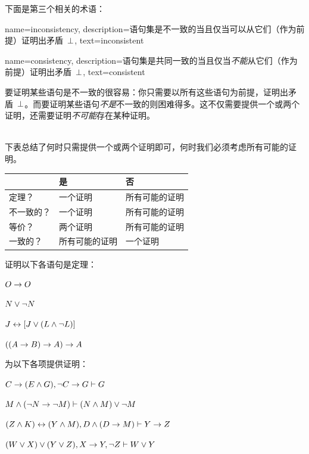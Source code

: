 下面是第三个相关的术语：

{    name={inconsistency},
  description={语句集是不一致的当且仅当可以从它们（作为前提）证明出矛盾~$\bot$},
    text={inconsistent}
}

{    name={consistency},
  description={语句集是共同一致的当且仅当\emph{不能}从它们（作为前提）证明出矛盾~$\bot$},
    text={consistent}
}

要证明某些语句是不一致的很容易：你只需要以所有这些语句为前提，证明出矛盾~$\bot$。而要证明某些语句\emph{不是}不一致的则困难得多。这不仅需要提供一个或两个证明，还需要证明\emph{不可能}存在某种证明。

\
\\
下表总结了何时只需提供一个或两个证明即可，何时我们必须考虑所有可能的证明。

\begin{center}
\begin{tabular}{l l l}
 & \textbf{是} & \textbf{否}\\
 \hline
定理？ & 一个证明 & 所有可能的证明\\
不一致的？ &  一个证明  & 所有可能的证明\\
等价？ & 两个证明 & 所有可能的证明\\
一致的？ & 所有可能的证明 & 一个证明\\
\end{tabular}
\end{center}

\practiceproblems
\problempart
证明以下各语句是定理：


\begin{compactlist}
\item $O \rightarrow O$
\item $N \vee \neg N$
\item $J \leftrightarrow [J\vee (L\wedge\neg L)]$
\item $((A \rightarrow B) \rightarrow A) \rightarrow A$
\end{compactlist}

\problempart
为以下各项提供证明：


\begin{compactlist}
\item $C\rightarrow(E\wedge G), \neg C \rightarrow G \vdash G$
\item $M \wedge (\neg N \rightarrow \neg M) \vdash (N \wedge M) \vee \neg M$
\item $(Z\wedge K)\leftrightarrow(Y\wedge M), D\wedge(D\rightarrow M) \vdash Y\rightarrow Z$
\item $(W \vee X) \vee (Y \vee Z), X\rightarrow Y, \neg Z \vdash W\vee Y$
\end{compactlist}

